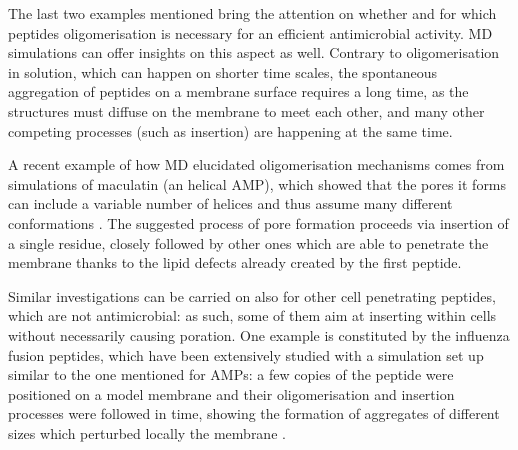 The last two examples mentioned bring the attention on whether and for which peptides oligomerisation is necessary for an efficient antimicrobial activity. MD simulations can offer insights on this aspect as well. Contrary to oligomerisation in solution, which can happen on shorter time scales, the spontaneous aggregation of peptides on a membrane surface requires a long time, as the structures must diffuse on the membrane to meet each other, and many other competing processes (such as insertion) are happening at the same time.

A recent example of how MD elucidated oligomerisation mechanisms comes from simulations of maculatin (an helical AMP), which showed that the pores it forms can include a variable number of helices and thus assume many different conformations \cite{Wang2016}. The suggested process of pore formation proceeds via insertion of a single residue, closely followed by other ones which are able to penetrate the membrane thanks to the lipid defects already created by the first peptide.

Similar investigations can be carried on also for other cell penetrating peptides, which are not antimicrobial: as such, some of them aim at inserting within cells without necessarily causing poration. One example is constituted by the influenza fusion peptides, which have been extensively studied with a simulation set up similar to the one mentioned for AMPs: a few copies of the peptide were positioned on a model membrane and their oligomerisation and insertion processes were followed in time, showing the formation of aggregates of different sizes which perturbed locally the membrane \cite{Haria2014,Collu2015}.

